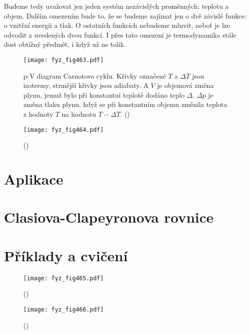     Budeme tedy uvažovat jen jeden systém nezávislých proměnných: teplotu a objem. Dalším
    omezením bude to, že se budeme zajímat jen o dvě závislé funkce: o vnitřní energii a tlak. O
    ostatních funkcích nebudeme mluvit, neboť je lze odvodit z uvedených dvou funkcí. I přes tato
    omezení je termodynamika stále dost obtížný předmět, i když už ne tolik.

    \begin{figure}[ht!] %
      \centering
      \texttt{[image: fyz\_fig463.pdf]}
      \caption{p-V diagram Carnotova cyklu. Křivky označené \(T\) a \(\Delta T\) jsou izotermy,
               strmější křivky jsou adiabaty. A \(V\) je objemová změna plynu, jemuž bylo při
               konstantní teplotě dodáno teplo \(\Delta\). \(\Delta p\) je změna tlaku plynu, když
               se při konstantním objemu změnila teplota z hodnoty \(T\) na hodnotu \(T - \Delta
               T\). (\cite[s.~615]{Feynman01})}
      \label{fyz:fig463}
    \end{figure}

    \begin{figure}[ht!] %
      \centering
      \texttt{[image: fyz\_fig464.pdf]}
      \caption{ 
               (\cite[s.~616]{Feynman01})}
      \label{fyz:fig464}
    \end{figure}

  \section{Aplikace}\label{fyz:IchapXLVsecII}
  \section{Clasiova-Clapeyronova rovnice}\label{fyz:IchapXLVsecIII}
  \section{Příklady a cvičení}\label{fyz:IchapXLVsecIV}



    \begin{figure}[ht!] %
      \centering
      \texttt{[image: fyz\_fig465.pdf]}
      \caption{ 
               (\cite[s.~707]{Feynman01})}
      \label{fyz:fig465}
    \end{figure}

    \begin{figure}[ht!] %
      \centering
      \texttt{[image: fyz\_fig466.pdf]}
      \caption{ 
               (\cite[s.~707]{Feynman01})}
      \label{fyz:fig466}
    \end{figure}

